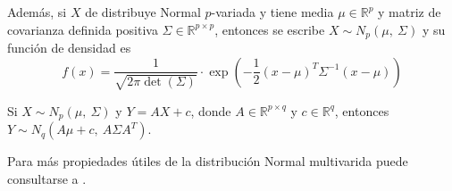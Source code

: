 Además, si $X$ de distribuye Normal $p$-variada y tiene media 
$\mu\in \mathbb R^p$ y matriz de covarianza definida positiva
$\Sigma \in \mathbb R^{p\times p}$, entonces se escribe
$X\sim N_p(\mu,\ \Sigma)$ y su función de densidad es 
\begin{equation*}
    f(x) = \frac{1}{\sqrt{2\pi\det(\Sigma)}}\cdot 
    \exp\left(
        -\frac{1}{2}(x-\mu)^T \Sigma^{-1} (x-\mu)
    \right)
\end{equation*}

\begin{theorem}
Si $X\sim N_p(\mu,\ \Sigma)$ y $Y=AX+c$, donde 
$A\in \mathbb R^{p\times q}$ y $c\in \mathbb R^q$, 
entonces $Y\sim N_q(A\mu + c,\ A\Sigma A^T)$.
\end{theorem}

Para más propiedades útiles de la distribución Normal multivarida puede 
consultarse a \cite{mardiaMultivariateAnalysis1979}.